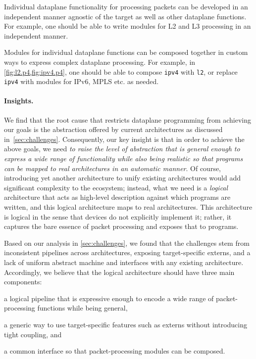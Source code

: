 \documentclass[letterpaper,twocolumn,10pt]{article}
\begin{document}
 Individual dataplane functionality for processing
packets can be developed in an independent manner agnostic of the
target as well as other dataplane functions. For example, one should
be able to write modules for L2 and L3 processing in an independent
manner.

 Modules for individual dataplane functions can
be composed together in custom ways to express complex dataplane
processing. For example, in \cref{fig:l2.p4,fig:ipv4.p4}, one should
be able to compose \texttt{ipv4} with \texttt{l2}, or replace
\texttt{ipv4} with modules for IPv6, MPLS etc. as needed.





\paragraph{Insights.}
We find that the root cause that restricts dataplane programming from
achieving our goals is the abstraction offered by current
architectures as discussed in~\cref{sec:challenges}.  Consequently,
our key insight is that in order to achieve the above goals, we need
\emph{to raise the level of abstraction that is general enough to
  express a wide range of functionality while also being realistic so
  that programs can be mapped to real architectures in an automatic
manner}. Of course, introducing yet another architecture to unify
existing architectures would add significant complexity to the
ecosystem; instead, what we need is a \emph{logical} architecture that
acts as high-level description against which programs are written, and
this logical architecture maps to real architectures. This
architecture is logical in the sense that devices do not explicitly
implement it; rather, it captures the bare essence of packet
processing and exposes that to programs.

Based on our analysis in \cref{sec:challenges}, we found that the
challenges stem from inconsistent pipelines across architectures,
exposing target-specific externs, and a lack of uniform abstract
machine and interfaces with any existing architecture. Accordingly, we
believe that the logical architecture should have three main
components:
\begin{enumerate*}[label=(\roman*)]
  \item a logical pipeline that is expressive enough to encode a
    wide range of packet-processing functions while being general,
  \item a generic way to use target-specific features such as externs
    without introducing tight coupling, and
  \item a common interface so that packet-processing modules can be
    composed.
\end{enumerate*}
\end{document}
